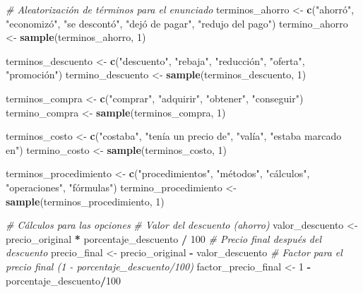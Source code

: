 \documentclass[
]{article}
\newenvironment{Shaded}{\begin{snugshade}}{\end{snugshade}}
\newcommand{\CommentTok}[1]{\textcolor[rgb]{0.56,0.35,0.01}{\textit{#1}}}
\newcommand{\DecValTok}[1]{\textcolor[rgb]{0.00,0.00,0.81}{#1}}
\newcommand{\FunctionTok}[1]{\textcolor[rgb]{0.13,0.29,0.53}{\textbf{#1}}}
\newcommand{\NormalTok}[1]{#1}
\newcommand{\OtherTok}[1]{\textcolor[rgb]{0.56,0.35,0.01}{#1}}
\newcommand{\SpecialCharTok}[1]{\textcolor[rgb]{0.81,0.36,0.00}{\textbf{#1}}}
\newcommand{\StringTok}[1]{\textcolor[rgb]{0.31,0.60,0.02}{#1}}
\begin{document}
\begin{Shaded}
\begin{Highlighting}[]
\CommentTok{\# Aleatorización de términos para el enunciado}
\NormalTok{terminos\_ahorro }\OtherTok{\textless{}{-}} \FunctionTok{c}\NormalTok{(}\StringTok{"ahorró"}\NormalTok{, }\StringTok{"economizó"}\NormalTok{, }\StringTok{"se descontó"}\NormalTok{, }\StringTok{"dejó de pagar"}\NormalTok{, }\StringTok{"redujo del pago"}\NormalTok{)}
\NormalTok{termino\_ahorro }\OtherTok{\textless{}{-}} \FunctionTok{sample}\NormalTok{(terminos\_ahorro, }\DecValTok{1}\NormalTok{)}

\NormalTok{terminos\_descuento }\OtherTok{\textless{}{-}} \FunctionTok{c}\NormalTok{(}\StringTok{"descuento"}\NormalTok{, }\StringTok{"rebaja"}\NormalTok{, }\StringTok{"reducción"}\NormalTok{, }\StringTok{"oferta"}\NormalTok{, }\StringTok{"promoción"}\NormalTok{)}
\NormalTok{termino\_descuento }\OtherTok{\textless{}{-}} \FunctionTok{sample}\NormalTok{(terminos\_descuento, }\DecValTok{1}\NormalTok{)}

\NormalTok{terminos\_compra }\OtherTok{\textless{}{-}} \FunctionTok{c}\NormalTok{(}\StringTok{"comprar"}\NormalTok{, }\StringTok{"adquirir"}\NormalTok{, }\StringTok{"obtener"}\NormalTok{, }\StringTok{"conseguir"}\NormalTok{)}
\NormalTok{termino\_compra }\OtherTok{\textless{}{-}} \FunctionTok{sample}\NormalTok{(terminos\_compra, }\DecValTok{1}\NormalTok{)}

\NormalTok{terminos\_costo }\OtherTok{\textless{}{-}} \FunctionTok{c}\NormalTok{(}\StringTok{"costaba"}\NormalTok{, }\StringTok{"tenía un precio de"}\NormalTok{, }\StringTok{"valía"}\NormalTok{, }\StringTok{"estaba marcado en"}\NormalTok{)}
\NormalTok{termino\_costo }\OtherTok{\textless{}{-}} \FunctionTok{sample}\NormalTok{(terminos\_costo, }\DecValTok{1}\NormalTok{)}

\NormalTok{terminos\_procedimiento }\OtherTok{\textless{}{-}} \FunctionTok{c}\NormalTok{(}\StringTok{"procedimientos"}\NormalTok{, }\StringTok{"métodos"}\NormalTok{, }\StringTok{"cálculos"}\NormalTok{, }\StringTok{"operaciones"}\NormalTok{, }\StringTok{"fórmulas"}\NormalTok{)}
\NormalTok{termino\_procedimiento }\OtherTok{\textless{}{-}} \FunctionTok{sample}\NormalTok{(terminos\_procedimiento, }\DecValTok{1}\NormalTok{)}

\CommentTok{\# Cálculos para las opciones}
\CommentTok{\# Valor del descuento (ahorro)}
\NormalTok{valor\_descuento }\OtherTok{\textless{}{-}}\NormalTok{ precio\_original }\SpecialCharTok{*}\NormalTok{ porcentaje\_descuento }\SpecialCharTok{/} \DecValTok{100}
\CommentTok{\# Precio final después del descuento}
\NormalTok{precio\_final }\OtherTok{\textless{}{-}}\NormalTok{ precio\_original }\SpecialCharTok{{-}}\NormalTok{ valor\_descuento}
\CommentTok{\# Factor para el precio final (1 {-} porcentaje\_descuento/100)}
\NormalTok{factor\_precio\_final }\OtherTok{\textless{}{-}} \DecValTok{1} \SpecialCharTok{{-}}\NormalTok{ porcentaje\_descuento}\SpecialCharTok{/}\DecValTok{100}


\end{Highlighting}
\end{Shaded}
\end{document}
